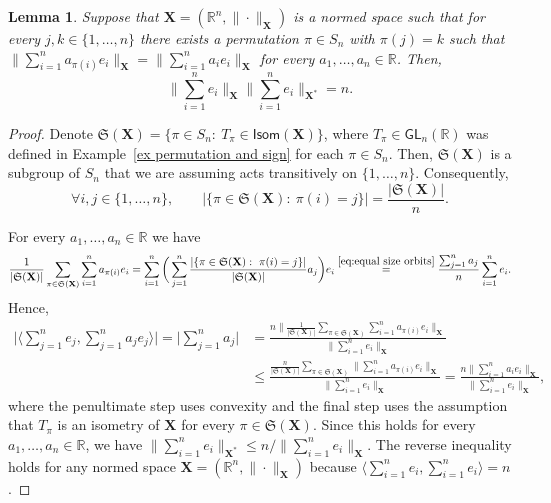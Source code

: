 \documentclass[11pt,reqno]{amsart}
\renewcommand{\le}{\leqslant}
\newcommand{\n}{\{1,\ldots,n\}}
\newcommand{\X}{\mathbf X}
\newcommand{\R}{\mathbb R}
\newtheorem{lemma}[theorem]{Lemma}
\theoremstyle{remark}
\newcommand{\GL}{\mathsf{GL}}
\renewcommand{\1}{\mathbf 1}
\begin{document}
\begin{lemma}\label{lem:loz is uniform} Suppose that $\X=(\R^n,\|\cdot\|_\X)$ is a normed space such that for every $j,k\in \n$ there exists a permutation $\pi\in S_n$ with $\pi(j)=k$ such that $\|\sum_{i=1}^n a_{\pi(i)}e_i\|_\X= \|\sum_{i=1}^n a_{i}e_i\|_\X$ for every $a_1,\ldots,a_n\in \R$. Then, $$\Big\|\sum_{i=1}^n e_i\Big\|_\X\Big\|\sum_{i=1}^n e_i\Big\|_{\X^{\textbf{*}}}=n.$$
\end{lemma}

\begin{proof} Denote $\mathfrak{S}(\X)=\{\pi\in S_n:\ T_\pi\in \mathsf{Isom}(\X)\}$, where $T_\pi\in \GL_n(\R)$ was defined in Example~\ref{ex permutation and sign} for each $\pi \in S_n$. Then, $\mathfrak{S}(\X)$ is a subgroup of $S_n$ that we are assuming acts transitively on $\n$. Consequently,
\begin{equation}\label{eq:equal size orbits}
\forall i,j\in \n,\qquad |\{\pi\in \mathfrak{S}(\X):\ \pi(i)=j\}|=\frac{|\mathfrak{S}(\X)|}{n}.
\end{equation}

For every $a_1,\ldots,a_n\in \R$ we have
$$
\frac{1}{|\mathfrak{S}(\X)|}\sum_{\pi\in \mathfrak{S}(\X)} \sum_{i=1}^n a_{\pi(i)}e_i=\sum_{i=1}^n \bigg(\sum_{j=1}^n \frac{|\{\pi\in \mathfrak{S}(\X):\ \pi(i)=j\}|}{|\mathfrak{S}(\X)|}a_j\bigg)e_i\stackrel{\eqref{eq:equal size orbits}}{=} \frac{\sum_{j=1}^na_j}{n}\sum_{i=1}^n e_i.
$$
Hence,
\begin{align*}
\Big|\Big\langle \sum_{j=1}^n e_j,\sum_{j=1}^n a_j e_j\Big\rangle\Big| =\Big|\sum_{j=1}^na_j\Big|&=\frac{n\big\|\frac{1}{|\mathfrak{S}(\X)|}\sum_{\pi\in \mathfrak{S}(\X)} \sum_{i=1}^n a_{\pi(i)}e_i\big\|_\X}{\big\|\sum_{i=1}^n e_i\big\|_\X}\\&\le \frac{\frac{n}{|\mathfrak{S}(\X)|}\sum_{\pi\in \mathfrak{S}(\X)}\big\|\sum_{i=1}^n a_{\pi(i)}e_i\big\|_\X}{\big\|\sum_{i=1}^n e_i\big\|_\X}=\frac{n\big\|\sum_{i=1}^n a_i e_i\big\|_\X}{\big\|\sum_{i=1}^n e_i\big\|_\X},
\end{align*}
where the penultimate step uses convexity and the final step uses the assumption that $T_\pi$ is an isometry of $\X$ for every $\pi\in \mathfrak{S}(\X)$. Since this holds for every $a_1,\ldots,a_n\in \R$, we have $\|\sum_{i=1}^n e_i\|_{\X^{\textbf{*}}}\le n/\|\sum_{i=1}^n e_i \|_\X$. The reverse inequality holds for any normed space $\X=(\R^n,\|\cdot\|_\X)$ because $\langle \sum_{i=1}^ne_i,\sum_{i=1}^ne_i\rangle=n$.
\end{proof}
\end{document}
